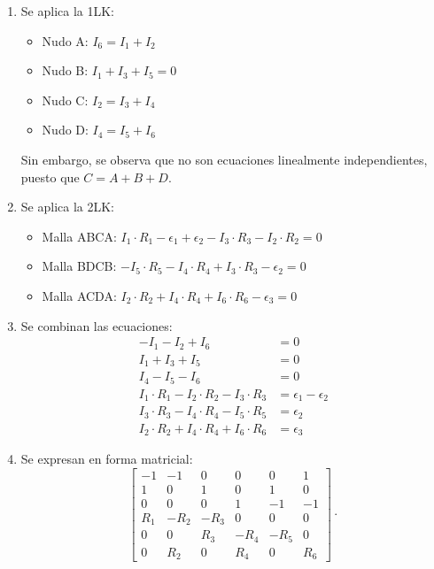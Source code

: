 \begin{example}
		\begin{enumerate}
			\item {Se aplica la 1LK:} 
			\begin{itemize}
				\item {Nudo A:} $I_6 = I_1 + I_2$
				\item {Nudo B:} $I_1 + I_3 + I_5 = 0$
				\item {Nudo C:} $I_2 = I_3 + I_4$
				\item {Nudo D:} $I_4 = I_5 + I_6$
			\end{itemize}
			Sin embargo, se observa que no son ecuaciones linealmente independientes, puesto que $C=A+B+D$.
			\item {Se aplica la 2LK:}
			\begin{itemize}
				\item {Malla ABCA:} $I_1 \cdot R_1 - \epsilon_1 + \epsilon_2 - I_3 \cdot R_3 - I_2 \cdot R_2 = 0$
				\item {Malla BDCB:} $-I_5 \cdot R_5 - I_4 \cdot R_4 + I_3 \cdot R_3 - \epsilon_2 = 0$
				\item {Malla ACDA:} $I_2 \cdot R_2 + I_4 \cdot R_4 + I_6 \cdot R_6 - \epsilon_3 = 0$
			\end{itemize}
			\item {Se combinan las ecuaciones:}
			\begin{align*}
				- I_1 -  I_2 + I_6  &= 0\\
				I_1 + I_3 + I_5 &= 0\\
				I_4 - I_5 - I_6 &= 0\\
				I_1 \cdot R_1 - I_2 \cdot R_2 - I_3 \cdot R_3 &= \epsilon_1 - \epsilon_2\\
				I_3 \cdot R_3 - I_4 \cdot R_4 -I_5 \cdot R_5 &= \epsilon_2\\
				I_2 \cdot R_2 + I_4 \cdot R_4 + I_6 \cdot R_6 &= \epsilon_3
			\end{align*}
			\item {Se expresan en forma matricial:}
			\begin{equation*}
				\begin{bmatrix}
					-1 & -1 & 0 & 0 & 0 & 1\\
					1 & 0 & 1 & 0 & 1 & 0\\
					0 & 0 & 0 & 1 & -1 & -1\\
					R_1 & -R_2 & - R_3 & 0 & 0 & 0\\
					0 & 0 & R_3 & - R_4 & - R_5 & 0\\
					0 & R_2 & 0 & R_4 & 0 & R_6
				\end{bmatrix} \cdot %

\end{equation*}
\end{enumerate}
\end{example}
